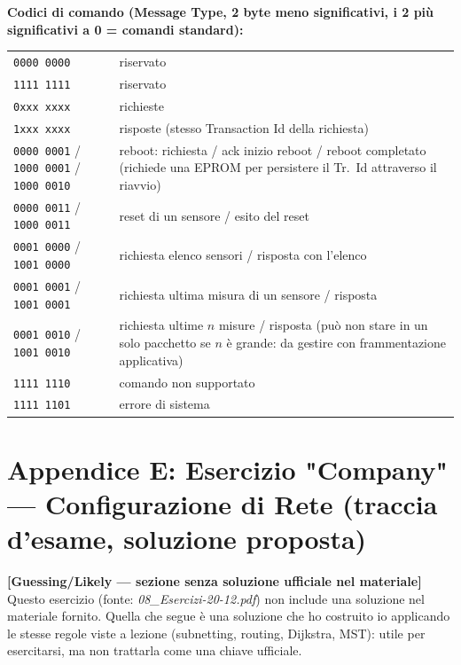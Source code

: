 \documentclass[12pt, a4paper]{article}
\begin{document}
\textbf{Codici di comando (Message Type, 2 byte meno significativi, i 2 più significativi a 0 = comandi standard):}
\begin{center}
\begin{tabular}{|l|p{8cm}|}
\hline
\texttt{0000 0000} & riservato \\
\texttt{1111 1111} & riservato \\
\texttt{0xxx xxxx} & richieste \\
\texttt{1xxx xxxx} & risposte (stesso Transaction Id della richiesta) \\
\texttt{0000 0001} / \texttt{1000 0001} / \texttt{1000 0010} & reboot: richiesta / ack inizio reboot / reboot completato (richiede una EPROM per persistere il Tr.\ Id attraverso il riavvio) \\
\texttt{0000 0011} / \texttt{1000 0011} & reset di un sensore / esito del reset \\
\texttt{0001 0000} / \texttt{1001 0000} & richiesta elenco sensori / risposta con l'elenco \\
\texttt{0001 0001} / \texttt{1001 0001} & richiesta ultima misura di un sensore / risposta \\
\texttt{0001 0010} / \texttt{1001 0010} & richiesta ultime $n$ misure / risposta (può non stare in un solo pacchetto se $n$ è grande: da gestire con frammentazione applicativa) \\
\texttt{1111 1110} & comando non supportato \\
\texttt{1111 1101} & errore di sistema \\
\hline
\end{tabular}
\end{center}

\section{Appendice E: Esercizio "Company" --- Configurazione di Rete (traccia d'esame, soluzione proposta)}

\textbf{[Guessing/Likely — sezione senza soluzione ufficiale nel materiale]} Questo esercizio (fonte: \textit{08\_Esercizi-20-12.pdf}) non include una soluzione nel materiale fornito. Quella che segue è una soluzione che ho costruito io applicando le stesse regole viste a lezione (subnetting, routing, Dijkstra, MST): utile per esercitarsi, ma non trattarla come una chiave ufficiale.
\end{document}
